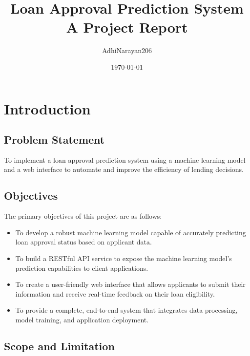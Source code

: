 \documentclass{report}
\title{Loan Approval Prediction System \\ \large A Project Report}
\author{AdhiNarayan206}
\date{\today}
\begin{document}
\maketitle

\tableofcontents

\chapter{Introduction}

\section{Problem Statement}
To implement a loan approval prediction system using a machine learning model and a web interface to automate and improve the efficiency of lending decisions.

\section{Objectives}
The primary objectives of this project are as follows:
\begin{itemize}
    \item To develop a robust machine learning model capable of accurately predicting loan approval status based on applicant data.
    \item To build a RESTful API service to expose the machine learning model's prediction capabilities to client applications.
    \item To create a user-friendly web interface that allows applicants to submit their information and receive real-time feedback on their loan eligibility.
    \item To provide a complete, end-to-end system that integrates data processing, model training, and application deployment.
\end{itemize}

\section{Scope and Limitation}
\end{document}
